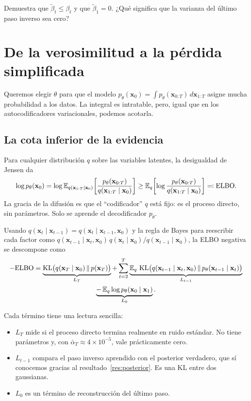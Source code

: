 \documentclass[11pt,letterpaper,oneside]{report}
\newcommand{\xb}{\mathbf{x}}
\newcommand{\ab}{\bar{\alpha}}
\begin{document}
\begin{ejercicio}
Demuestra que $\tilde\beta_t\leq\beta_t$ y que $\tilde\beta_1=0$. ¿Qué significa que la varianza del último paso inverso sea cero?
\end{ejercicio}

\section{De la verosimilitud a la pérdida simplificada}\label{sec:elbo}

Queremos elegir $\theta$ para que el modelo $p_\theta(\xb_0)=\int p_\theta(\xb_{0:T})\,d\xb_{1:T}$ asigne mucha probabilidad a los datos. La integral es intratable, pero, igual que en los autocodificadores variacionales, podemos acotarla.

\subsection{La cota inferior de la evidencia}

Para cualquier distribución $q$ sobre las variables latentes, la desigualdad de Jensen da
\[
\log p_\theta(\xb_0)=\log\E_{q(\xb_{1:T}\mid\xb_0)}\!\left[\frac{p_\theta(\xb_{0:T})}{q(\xb_{1:T}\mid\xb_0)}\right]
\geq\E_{q}\!\left[\log\frac{p_\theta(\xb_{0:T})}{q(\xb_{1:T}\mid\xb_0)}\right]\eqqcolon\mathrm{ELBO}.
\]
La gracia de la difusión es que el ``codificador'' $q$ está fijo: es el proceso directo, sin parámetros. Solo se aprende el decodificador $p_\theta$.

\begin{teorema}\label{res:elbo}
Usando $q(\xb_t\mid\xb_{t-1})=q(\xb_t\mid\xb_{t-1},\xb_0)$ y la regla de Bayes para reescribir cada factor como $q(\xb_{t-1}\mid\xb_t,\xb_0)\,q(\xb_t\mid\xb_0)/q(\xb_{t-1}\mid\xb_0)$, la ELBO negativa se descompone como
\begin{multline*}
-\mathrm{ELBO}=\underbrace{\KL\!\big(q(\xb_T\mid\xb_0)\,\Vert\,p(\xb_T)\big)}_{L_T}
+\sum_{t=2}^{T}\underbrace{\E_q\,\KL\!\big(q(\xb_{t-1}\mid\xb_t,\xb_0)\,\Vert\,p_\theta(\xb_{t-1}\mid\xb_t)\big)}_{L_{t-1}}\\
\underbrace{-\,\E_q\log p_\theta(\xb_0\mid\xb_1)}_{L_0}.
\end{multline*}
\end{teorema}

Cada término tiene una lectura sencilla:
\begin{itemize}
  \item $L_T$ mide si el proceso directo termina realmente en ruido estándar. No tiene parámetros y, con $\ab_T\approx4\times10^{-5}$, vale prácticamente cero.
  \item $L_{t-1}$ compara el paso inverso aprendido con el posterior verdadero, que sí conocemos gracias al resultado~\ref{res:posterior}. Es una KL entre dos gaussianas.
  \item $L_0$ es un término de reconstrucción del último paso.
\end{itemize}
\end{document}
